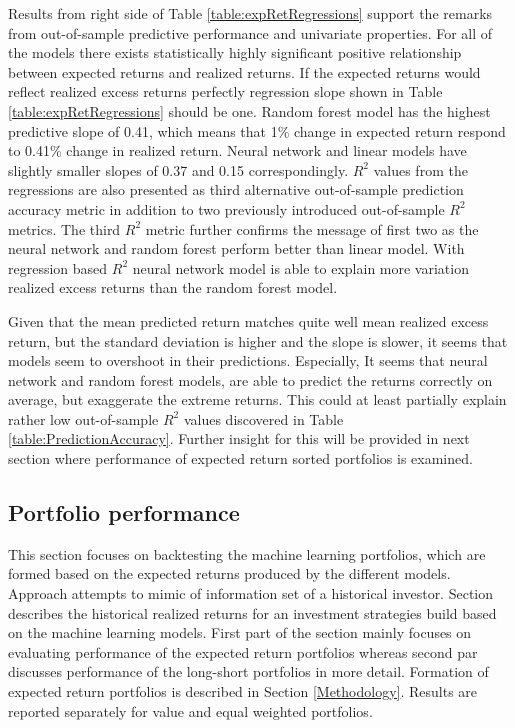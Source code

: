 \documentclass{article}
\begin{document}
Results from right side of Table \ref{table:expRetRegressions} support the remarks from out-of-sample predictive performance and univariate properties. For all of the models there exists statistically highly significant positive relationship between expected returns and realized returns. If the expected returns would reflect realized excess returns perfectly regression slope shown in Table \ref{table:expRetRegressions} should be one. Random forest model has the highest predictive slope of 0.41, which means that 1\% change in expected return respond to 0.41\% change in realized return. Neural network and linear models have slightly smaller slopes of 0.37 and 0.15 correspondingly. $R^2$ values from the regressions are also presented as third alternative out-of-sample prediction accuracy metric in addition to two previously introduced out-of-sample $R^2$ metrics. The third $R^2$ metric further confirms the message of first two as the neural network and random forest perform better than linear model. With regression based $R^2$ neural network model is able to explain more variation realized excess returns than the random forest model. \par

Given that the mean predicted return matches quite well mean realized excess return, but the standard deviation is higher and the slope is slower, it seems that models seem to overshoot in their predictions. Especially, It seems that neural network and random forest models, are able to predict the returns correctly on average, but exaggerate the extreme returns. This could at least partially explain rather low out-of-sample $R^2$ values discovered in Table \ref{table:PredictionAccuracy}. Further insight for this will be provided in next section where performance of expected return sorted portfolios is examined. \par

\subsection{Portfolio performance}\label{PortfolioPerformance}

This section focuses on backtesting the machine learning portfolios, which are formed based on the expected returns produced by the different models. Approach attempts to mimic of information set of a historical investor. Section describes the historical realized returns for an investment strategies build based on the machine learning models. First part of the section mainly focuses on evaluating performance of the expected return portfolios whereas second par discusses performance of the long-short portfolios in more detail. Formation of expected return portfolios is described in Section \ref{Methodology}. Results are reported separately for value and equal weighted portfolios. \par
\end{document}
